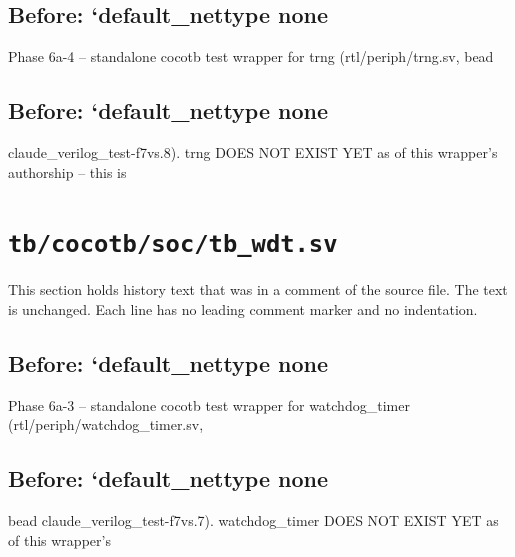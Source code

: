 \begin{record}

\subsection*{Before: `default\_nettype none}

\begin{textblock}
Phase 6a-4 -- standalone cocotb test wrapper for trng (rtl/periph/trng.sv, bead
\end{textblock}

\subsection*{Before: `default\_nettype none}

\begin{textblock}
claude_verilog_test-f7vs.8). trng DOES NOT EXIST YET as of this wrapper's authorship -- this is
\end{textblock}

\end{record}

\section{\texttt{tb/cocotb/soc/tb\_wdt.sv}}\label{cr:suite:soc-tb-wdt-sv}

This section holds history text that was in a comment of the source file. The text is unchanged. Each line has no leading comment marker and no indentation.

\begin{record}

\subsection*{Before: `default\_nettype none}

\begin{textblock}
Phase 6a-3 -- standalone cocotb test wrapper for watchdog_timer (rtl/periph/watchdog_timer.sv,
\end{textblock}

\subsection*{Before: `default\_nettype none}

\begin{textblock}
bead claude_verilog_test-f7vs.7). watchdog_timer DOES NOT EXIST YET as of this wrapper's
\end{textblock}

\end{record}

